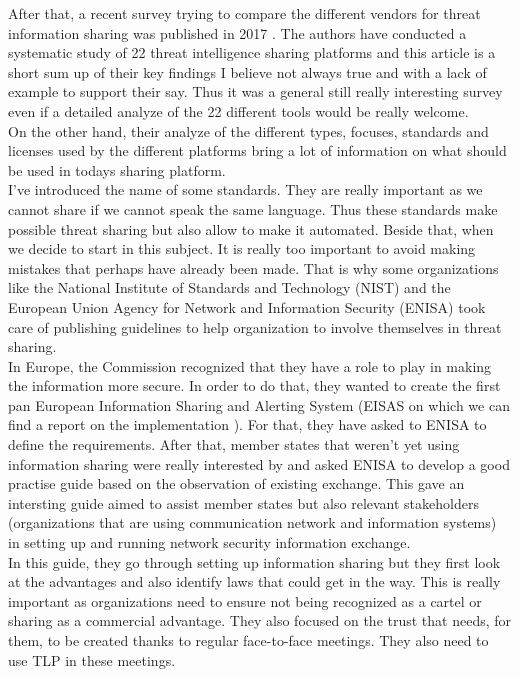 \documentclass{eplmastersthesis}
\begin{document}
After that, a recent survey trying to compare the different vendors for threat information sharing was published in 2017 \cite{sauerwein2017threat}. The authors have conducted a systematic study of 22 threat intelligence sharing platforms and this article is a short sum up of their key findings I believe not always true and with a lack of example to support their say. Thus it was a general still really interesting survey even if a detailed analyze of the 22 different tools would be really welcome.\\
On the other hand, their analyze of the different types, focuses, standards and licenses used by the different platforms bring a lot of information on what should be used in todays sharing platform.\\

I've introduced the name of some standards. They are really important as we cannot share if we cannot speak the same language. Thus these standards make possible threat sharing but also allow to make it automated. Beside that, when we decide to start in this subject. It is really too important to avoid making mistakes that perhaps have already been made. That is why some organizations like the National Institute of Standards and Technology (NIST) and the European Union Agency for Network and Information Security (ENISA) took care of publishing guidelines to help organization to involve themselves in threat sharing.\\
In Europe, the Commission recognized that they have a role to play in making the information more secure. In order to do that, they wanted to create the first pan European Information Sharing and Alerting System (EISAS on which we can find a report on the implementation \cite{eisasRapport}). For that, they have asked to ENISA to define the requirements. After that, member states that weren't yet using information sharing were really interested by and asked ENISA to develop a good practise guide based on the observation of existing exchange. This gave an intersting guide \cite{enisaguide2009} aimed to assist member states but also relevant stakeholders (organizations that are using communication network and information systems) in setting up and running network security information exchange.\\
In this guide, they go through setting up information sharing but they first look at the advantages and also identify laws that could get in the way. This is really important as organizations need to ensure not being recognized as a cartel or sharing as a commercial advantage. They also focused on the trust that needs, for them, to be created thanks to regular face-to-face meetings. They also need to use TLP in these meetings.\\
\end{document}
